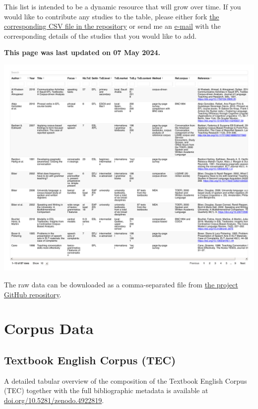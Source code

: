 \documentclass[
  letterpaper,
  DIV=11,
  numbers=noendperiod]{scrreprt}
\begin{document}
This list is intended to be a dynamic resource that will grow over time.
If you would like to contribute any studies to the table, please either
fork
\href{https://github.com/elenlefoll/TextbookEnglish/blob/main/LitReviewTable.csv}{the
corresponding CSV file in the repository} or send me an
\href{mailto:elefoll@uni-koeln.de?subject=\%5BLitReviewTable\%5D\%20Suggestions}{e-mail}
with the corresponding details of the studies that you would like to
add.

\textbf{This page was last updated on 07 May 2024.}

\includegraphics{AppendixA_files/figure-pdf/display-1.pdf}

The raw data can be downloaded as a comma-separated file from
\href{https://github.com/elenlefoll/TextbookMDA}{the project GitHub
repository}.

\chapter{Corpus Data}\label{corpus-data}

\section{Textbook English Corpus
(TEC)}\label{textbook-english-corpus-tec}

A detailed tabular overview of the composition of the Textbook English
Corpus (TEC) together with the full bibliographic metadata is available
at
\href{https://doi.org/10.5281/zenodo.4922819}{doi.org/10.5281/zenodo.4922819}.
\end{document}
